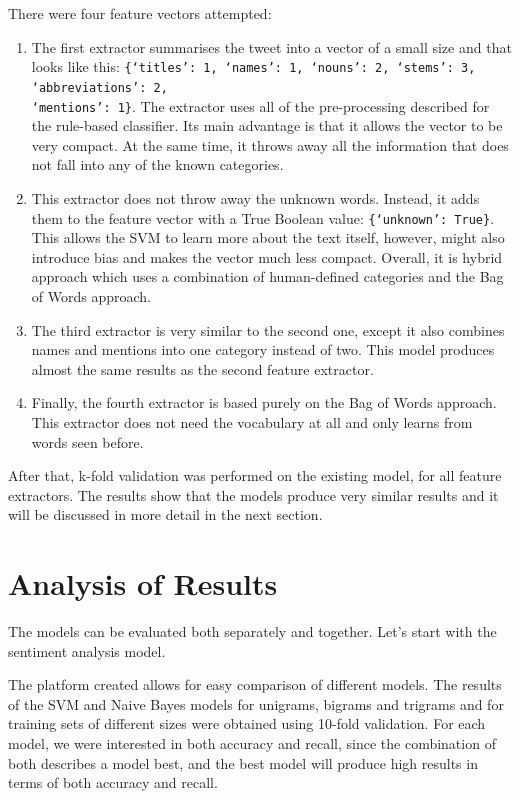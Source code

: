 There were four feature vectors attempted:
\begin{enumerate}
    \item The first extractor summarises the tweet into a vector of a small size and that looks like this: \texttt{\{`titles': 1, `names': 1, `nouns': 2, `stems': 3, `abbreviations': 2,\\ `mentions': 1\}}. The extractor uses all of the pre-processing described for the rule-based classifier. Its main advantage is that it allows the vector to be very compact. At the same time, it throws away all the information that does not fall into any of the known categories. 
    \item This extractor does not throw away the unknown words. Instead, it adds them to the feature vector with a True Boolean value: \texttt{\{`unknown': True\}}. This allows the SVM to learn more about the text itself, however, might also introduce bias and makes the vector much less compact. Overall, it is hybrid approach which uses a combination of human-defined categories and the Bag of Words approach.
    \item The third extractor is very similar to the second one, except it also combines names and mentions into one category instead of two. This model produces almost the same results as the second feature extractor.
    \item Finally, the fourth extractor is based purely on the Bag of Words approach. This extractor does not need the vocabulary at all and only learns from words seen before. 
\end{enumerate}

After that, k-fold validation was performed on the existing model, for all feature extractors. The results show that the models produce very similar results and it will be discussed in more detail in the next section.

\section{Analysis of Results}
\label{sec:analysis}

The models can be evaluated both separately and together. Let's start with the sentiment analysis model.

The platform created allows for easy comparison of different models. The results of the SVM and Naive Bayes models for unigrams, bigrams and trigrams and for training sets of different sizes were obtained using 10-fold validation. For each model, we were interested in both accuracy and recall, since the combination of both describes a model best, and the best model will produce high results in terms of both accuracy and recall.

